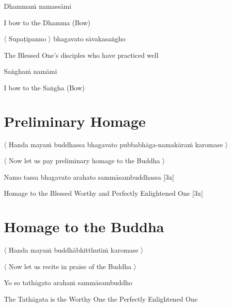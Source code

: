Dhammaṁ namassāmi\relax

\begin{english}
  I bow to the Dhamma \hfill{(Bow)}
\end{english}

〈 Supaṭipanno 〉 bhagavato sāvakasaṅgho

\begin{english}
  The Blessed One's disciples who have practiced well
\end{english}

Saṅghaṁ namāmi

\begin{english}
  I bow to the Saṅgha \hfill{(Bow)}
\end{english}

\section{Preliminary Homage}
\label{preliminary-homage}

\begin{leader}
  〈 Handa mayaṁ buddhassa bhagavato pubbabhāga-namakāraṁ karomase 〉
\end{leader}

\begin{leader-english}
  〈 Now let us pay preliminary homage to the Buddha 〉
\end{leader-english}

Namo tassa bhagavato arahato sammāsambuddhassa \hfill{[3x]}

\begin{english}
  Homage to the Blessed Worthy and Perfectly Enlightened One \hfill{[3x]}
\end{english}

\section{Homage to the Buddha}
\label{homage-buddha}

\begin{leader}
  〈 Handa mayaṁ buddhābhitthutiṁ karomase 〉
\end{leader}
\begin{leader-english}
  〈 Now let us recite in praise of the Buddha 〉
\end{leader-english}

Yo so tathāgato arahaṁ sammāsambuddho

\begin{english}
  The Tathāgata is the Worthy One the Perfectly Enlightened One
\end{english}

